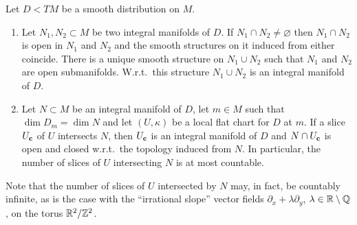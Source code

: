 \begin{lem}[{{\cite[Lem.~3.5.14]{RS1}}}]\label{lem 3.5.14 RS1}
    Let $D<TM$ be a smooth distribution on $M$.
    \begin{enumerate}
        \item Let $N_1,N_2\subset M$ be two integral manifolds of $D$. If $N_1\cap N_2\neq \varnothing$ then $N_1\cap N_2$ is open in $N_1$ and $N_2$ and the smooth structures on it induced from either coincide. There is a unique smooth structure on $N_1\cup N_2$ such that $N_1$ and $N_2$ are open submanifolds. W.r.t.~this structure $N_1\cup N_2$ is an integral manifold of $D$.

        \item Let $N\subset M$ be an integral manifold of $D$, let $m\in M$ such that $\dim D_m=\dim N$ and let $(U,\kappa)$ be a local flat chart for $D$ at $m$. If a slice $U_{\bf{c}}$ of $U$ intersects $N$, then $U_{\bf{c}}$ is an integral manifold of $D$ and $N\cap U_{\bf{c}}$ is open and closed w.r.t.~the topology induced from $N$. In particular, the number of slices of $U$ intersecting $N$ is at most countable.  
    \end{enumerate}
\end{lem}
Note that the number of slices of $U$ intersected by $N$ may, in fact, be countably infinite, as is the case with the ``irrational slope'' vector fields $\partial_x+\lambda\partial_y$, $\lambda\in\bbR\setminus\bbQ$, on the torus $\bbR^2\slash \bbZ^2$.
